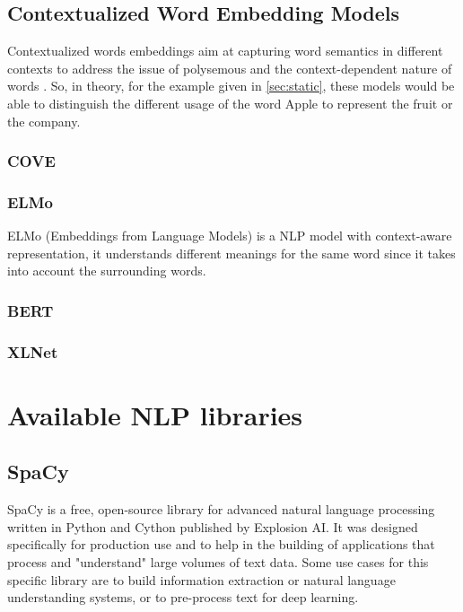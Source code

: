     \subsection{Contextualized Word Embedding Models}
        
        \par Contextualized words embeddings aim at capturing word semantics in different contexts to address the issue of polysemous and the context-dependent nature of words \cite{Batista2018}. So, in theory, for the example given in  \ref{sec:static}, these models would be able to distinguish the different usage of the word Apple to represent the fruit or the company.



        \subsubsection{COVE}
        \subsubsection{ELMo}
            ELMo (Embeddings from Language Models) is a NLP model with context-aware representation, it understands different meanings for the same word since it takes into account the surrounding words.



        \subsubsection{BERT}
        \subsubsection{XLNet}
        

       
\section{Available NLP libraries}


        \subsection{SpaCy}
        
        \par SpaCy is a free, open-source library for advanced natural language processing written in Python and Cython published by Explosion AI. It was designed specifically for production use and to help in the building of applications that process and "understand" large volumes of text data.  Some use cases for this specific library are to build information extraction or natural language understanding systems, or to pre-process text for deep learning. \cite{Spacy2017}

